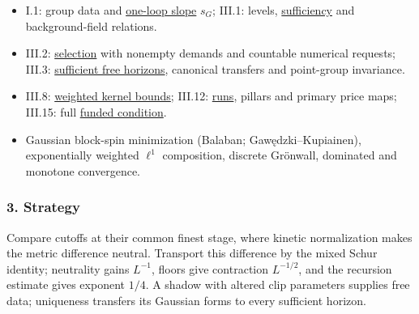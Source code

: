 \documentclass[
  letterpaper,
  11pt]{article}
\newcounter{none} %
\providecommand{\tightlist}{%
  \setlength{\itemsep}{0pt}\setlength{\parskip}{0pt}}
\begin{document}
\begin{itemize}
\tightlist
\item
  I.1: group data and
  \href{https://github.com/yang-mills-group/OpenAI-YM-20261028/blob/3456e5e75cf8d4cd558955a5c7638fba2d68f464/YM/Gauge/Colors.lean\#L184}{one-loop
  slope} \(s_G\); III.1: levels,
  \href{https://github.com/yang-mills-group/OpenAI-YM-20261028/blob/3456e5e75cf8d4cd558955a5c7638fba2d68f464/YM/PREC/Stacks.lean\#L132-L139}{sufficiency}
  and background-field relations.
\item
  III.2:
  \href{https://github.com/yang-mills-group/OpenAI-YM-20261028/blob/3456e5e75cf8d4cd558955a5c7638fba2d68f464/YM/Integration/NativePreselectedPostnumericPeriodRun.lean\#L99-L114}{selection}
  with nonempty demands and countable numerical requests; III.3:
  \href{https://github.com/yang-mills-group/OpenAI-YM-20261028/blob/3456e5e75cf8d4cd558955a5c7638fba2d68f464/YM/Next/FREE_KERNELS/Rack.lean\#L134-L145}{sufficient
  free horizons}, canonical transfers and point-group invariance.
\item
  III.8:
  \href{https://github.com/yang-mills-group/OpenAI-YM-20261028/blob/3456e5e75cf8d4cd558955a5c7638fba2d68f464/YM/Pert/Bulk/Atlas.lean\#L37-L42}{weighted
  kernel bounds}; III.12:
  \href{https://github.com/yang-mills-group/OpenAI-YM-20261028/blob/3456e5e75cf8d4cd558955a5c7638fba2d68f464/YM/FullVolume/Cross.lean\#L30-L48}{runs},
  pillars and primary price maps; III.15: full
  \href{https://github.com/yang-mills-group/OpenAI-YM-20261028/blob/3456e5e75cf8d4cd558955a5c7638fba2d68f464/YM/R2I/Campaign/Accepted.lean\#L60-L73}{funded
  condition}.
\item
  Gaussian block-spin minimization (Balaban; Gawędzki--Kupiainen),
  exponentially weighted \(\ell^1\) composition, discrete Grönwall,
  dominated and monotone convergence.
\end{itemize}

\subsubsection{3. Strategy}\label{strategy-16}

Compare cutoffs at their common finest stage, where kinetic
normalization makes the metric difference neutral. Transport this
difference by the mixed Schur identity; neutrality gains \(L^{-1}\),
floors give contraction \(L^{-1/2}\), and the recursion estimate gives
exponent \(1/4\). A shadow with altered clip parameters supplies free
data; uniqueness transfers its Gaussian forms to every sufficient
horizon.
\end{document}
